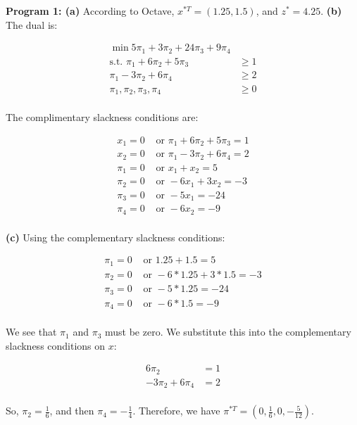 \documentclass[fleqn]{homework}
\begin{document}
\begin{problem}{2}
    \textbf{Program 1: (a)} According to Octave, $x^{*T} = (1.25, 1.5)$, and
    $z^* = 4.25$.  \textbf{(b)} The dual is:

    \begin{align*}
      \min 5\pi_1 + 3\pi_2 + 24\pi_3 + 9\pi_4 &\\
      \text{s.t. } \pi_1 + 6\pi_2 + 5\pi_3 &\ge 1 \\
      \pi_1 - 3\pi_2 + 6\pi_4 &\ge 2\\
      \pi_1, \pi_2, \pi_3, \pi_4 &\ge 0\\
    \end{align*}

    The complimentary slackness conditions are:

    \begin{align*}
      x_1 = 0 &\text{ or } \pi_1 + 6\pi_2 + 5\pi_3 = 1 \\
      x_2 = 0 &\text{ or } \pi_1 - 3\pi_2 + 6 \pi_4 = 2 \\
      \pi_1 = 0 &\text{ or } x_1 + x_2 = 5 \\
      \pi_2 = 0 &\text{ or } -6x_1 + 3x_2 = -3 \\
      \pi_3 = 0 &\text{ or } -5x_1 = -24 \\
      \pi_4 = 0 &\text{ or } -6x_2 = -9 \\
    \end{align*}

    \textbf{(c)} Using the complementary slackness conditions:

    \begin{align*}
      \pi_1 = 0 &\text{ or } 1.25 + 1.5 = 5 \\
      \pi_2 = 0 &\text{ or } -6*1.25 + 3*1.5 = -3 \\
      \pi_3 = 0 &\text{ or } -5*1.25 = -24 \\
      \pi_4 = 0 &\text{ or } -6*1.5 = -9 \\
    \end{align*}

    We see that $\pi_1$ and $\pi_3$ must be zero.  We substitute this into the
    complementary slackness conditions on $x$:

    \begin{align*}
      6\pi_2 &= 1 \\
      -3\pi_2 + 6 \pi_4 &= 2 \\
    \end{align*}

    So, $\pi_2 = \frac{1}{6}$, and then $\pi_4 = -\frac{1}{4}$.  Therefore, we
    have $\pi^{*T} = (0, \frac{1}{6}, 0, -\frac{5}{12})$.


\end{problem}
\end{document}
